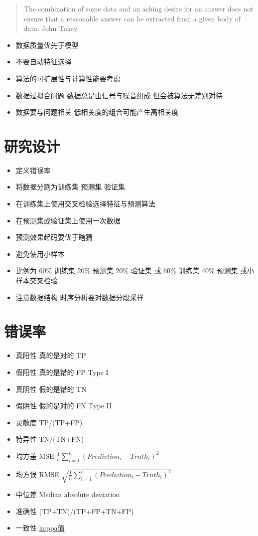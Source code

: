 \documentclass[
]{book}
\providecommand{\tightlist}{%
  \setlength{\itemsep}{0pt}\setlength{\parskip}{0pt}}
\begin{document}
\begin{quote}
The combination of some data and an aching desire for an answer does not ensure that a reasonable answer can be extracted from a given body of data. John Tukey
\end{quote}

\begin{itemize}
\tightlist
\item
  数据质量优先于模型
\item
  不要自动特征选择
\item
  算法的可扩展性与计算性能要考虑
\item
  数据过拟合问题 数据总是由信号与噪音组成 但会被算法无差别对待
\item
  数据要与问题相关 低相关度的组合可能产生高相关度
\end{itemize}

\hypertarget{ux7814ux7a76ux8bbeux8ba1}{%
\section{研究设计}\label{ux7814ux7a76ux8bbeux8ba1}}

\begin{itemize}
\tightlist
\item
  定义错误率
\item
  将数据分割为训练集 预测集 验证集
\item
  在训练集上使用交叉检验选择特征与预测算法
\item
  在预测集或验证集上使用一次数据
\item
  预测效果起码要优于瞎猜
\item
  避免使用小样本
\item
  比例为 60\% 训练集 20\% 预测集 20\% 验证集 或 60\% 训练集 40\% 预测集 或小样本交叉检验
\item
  注意数据结构 时序分析要对数据分段采样
\end{itemize}

\hypertarget{ux9519ux8befux7387}{%
\section{错误率}\label{ux9519ux8befux7387}}

\begin{itemize}
\tightlist
\item
  真阳性 真的是对的 TP
\item
  假阳性 真的是错的 FP Type I
\item
  真阴性 假的是错的 TN
\item
  假阴性 假的是对的 FN Type II
\item
  灵敏度 TP/(TP+FP)
\item
  特异性 TN/(TN+FN)
\item
  均方差 MSE \(\frac{1}{n} \sum_{i=1}^n (Prediction_i - Truth_i)^2\)
\item
  均方误 RMSE \(\sqrt{\frac{1}{n} \sum_{i=1}^n(Prediction_i - Truth_i)^2}\)
\item
  中位差 Median absolute deviation
\item
  准确性 (TP+TN)/(TP+FP+TN+FP)
\item
  一致性 \href{https://en.wikipedia.org/wiki/Cohen\%27s_kappa}{kappa值}
\end{itemize}
\end{document}
